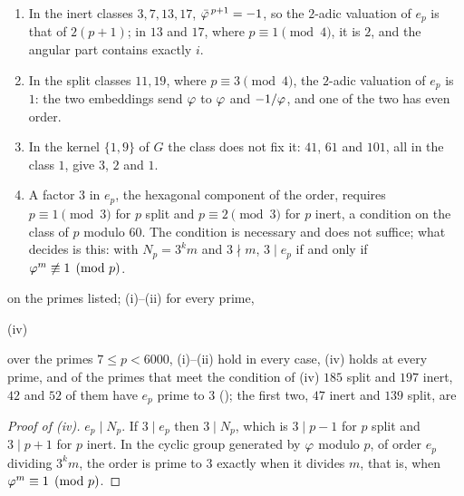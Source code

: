 \begin{proposition}\label{prop:class-angular}
\begin{enumerate}[label=\textup{(\roman*)}]
  \item In the inert classes $3,7,13,17$, $\bar{\varphi}^{\,p+1}=-1$, so the $2$-adic valuation of $e_p$ is
    that of $2(p+1)$; in $13$ and $17$, where $p\equiv1\pmod4$, it is $2$, and the angular part
    contains exactly $i$.
  \item In the split classes $11,19$, where $p\equiv3\pmod4$, the $2$-adic valuation of $e_p$ is $1$:
    the two embeddings send $\varphi$ to $\varphi$ and $-1/\varphi$, and one of the two has even order.
  \item In the kernel $\{1,9\}$ of $G$ the class does not fix it: $41$, $61$ and $101$, all in
    the class $1$, give $3$, $2$ and $1$.
  \item A factor $3$ in $e_p$, the hexagonal component of the order, requires $p\equiv1\pmod3$ for $p$ split and
    $p\equiv2\pmod3$ for $p$ inert, a condition on the class of $p$ modulo $60$.  The condition is necessary and
    does not suffice; what decides is this: with $N_p=3^km$ and $3\nmid m$, $3\mid e_p$ if and only if
    $\varphi^{m}\not\equiv1\pmod p$.
\end{enumerate}
\end{proposition}
on the primes listed; (i)--(ii) for every prime,

(iv)

over the
primes $7\le p<6000$, (i)--(ii) hold in every case, (iv) holds at every prime, and of the primes that meet the
condition of (iv) $185$ split and $197$ inert, $42$ and $52$ of them have $e_p$ prime to $3$
(); the first two, $47$ inert and $139$ split, are

\begin{proof}[Proof of \textup{(iv)}]
$e_p\mid N_p$.  If $3\mid e_p$ then $3\mid N_p$, which is $3\mid p-1$ for $p$ split and $3\mid p+1$ for $p$ inert.
In the cyclic group generated by $\varphi$ modulo $p$, of order $e_p$ dividing $3^km$, the order is prime to $3$
exactly when it divides $m$, that is, when $\varphi^m\equiv1\pmod p$.
\end{proof}


